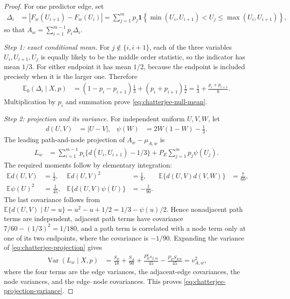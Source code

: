 \begin{proof}
For one predictor edge, set
\begin{align*}
  \Delta_i
  &=|F_w(U_{i+1})-F_w(U_i)|
  =\sum_{j=1}^m p_j
    \mathbf{1}\!\left\{
      \min(U_i,U_{i+1})<U_j
      \leq\max(U_i,U_{i+1})
    \right\},
\end{align*}
so that $A_w=\sum_{i=1}^{m-1}p_i\Delta_i$.

\medskip\noindent
\emph{Step 1: exact conditional mean.}
For $j\notin\{i,i+1\}$, each of the three variables $U_i,U_{i+1},U_j$ is
equally likely to be the middle order statistic, so the indicator has mean
$1/3$. For either endpoint it has mean $1/2$, because the endpoint is
included precisely when it is the larger one. Therefore
\begin{align*}
  \mathbb{E}_0(\Delta_i\mid X,p)
  &=(1-p_i-p_{i+1})\frac13
    +(p_i+p_{i+1})\frac12
  =\frac13+\frac{p_i+p_{i+1}}6.
\end{align*}
Multiplication by $p_i$ and summation prove
\eqref{eq:chatterjee-null-mean}.

\medskip\noindent
\emph{Step 2: projection and its variance.}
For independent uniform $U,V,W$, let
\begin{align*}
  d(U,V)
  &=|U-V|,
  &
  \psi(W)
  &=2W(1-W)-\frac13.
\end{align*}
The leading path-and-node projection of $A_w-\mu_{A,w}$ is
\begin{align}
  L_w
  &=\sum_{i=1}^{m-1}p_i\{d(U_i,U_{i+1})-1/3\}
    +P_E\sum_{j=1}^m p_j\psi(U_j).
  \label{eq:chatterjee-projection}
\end{align}
The required moments follow by elementary integration:
\begin{align*}
  \mathbb{E}d(U,V)
  &=\frac13,
  &
  \mathbb{E}d(U,V)^2
  &=\frac16,
  &
  \mathbb{E}\{d(U,V)d(V,W)\}
  &=\frac{7}{60},\\
  \mathbb{E}\psi(U)^2
  &=\frac1{45},
  &
  \mathbb{E}\{d(U,V)\psi(U)\}
  &=-\frac1{90}.
\end{align*}
The last covariance follows from
$\mathbb{E}\{d(U,V)\mid U=u\}=u^2-u+1/2=1/3-\psi(u)/2$. Hence nonadjacent
path terms are independent, adjacent path terms have covariance
$7/60-(1/3)^2=1/180$, and a path term is correlated with a node term only at
one of its two endpoints, where the covariance is $-1/90$. Expanding the
variance of \eqref{eq:chatterjee-projection} gives
\begin{align*}
  \operatorname{Var}(L_w\mid X,p)
  &=\frac{S_E}{18}+\frac{S_A}{90}
    +\frac{P_E^2s_{2,m}}{45}
    -\frac{P_ES_{EN}}{45}
  =v_{A,w}^2,
\end{align*}
where the four terms are the edge variances, the adjacent-edge covariances,
the node variances, and the edge--node covariances. This proves
\eqref{eq:chatterjee-projection-variance}.


\end{proof}
